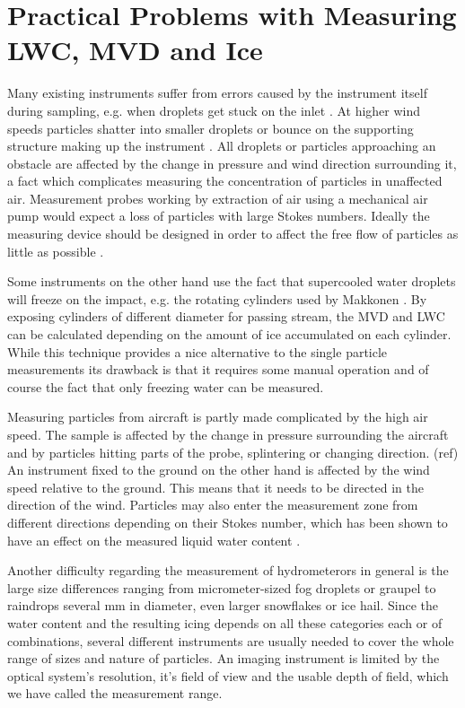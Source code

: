 \section{Practical Problems with Measuring LWC, MVD and Ice}
Many existing instruments suffer from errors caused by the instrument itself during sampling, e.g. when droplets get stuck on the inlet \cite{spie2012}. At higher wind speeds particles shatter into smaller droplets or bounce on the supporting structure making up the instrument \cite{cohen1991,field2006}. All droplets or particles approaching an obstacle are affected by the change in pressure and wind direction surrounding it, a fact which complicates measuring the concentration of particles in unaffected air. Measurement probes working by extraction of air using a mechanical air pump would expect a loss of particles with large Stokes numbers. Ideally the measuring device should be designed in order to affect the free flow of particles as little as possible \cite{baum2011}.

Some instruments on the other hand use the fact that supercooled water droplets will freeze on the impact, e.g. the rotating cylinders used by Makkonen \cite{makk1992}. By exposing cylinders of different diameter for passing stream, the MVD and LWC can be calculated depending on the amount of ice accumulated on each cylinder. While this technique provides a nice alternative to the single particle measurements its drawback is that it requires some manual operation and of course the fact that only freezing water can be measured.

Measuring particles from aircraft is partly made complicated by the high air speed. The sample is affected by the change in pressure surrounding the aircraft and by particles hitting parts of the probe, splintering or changing direction. (ref) An instrument fixed to the ground on the other hand is affected by the wind speed relative to the ground. This means that it needs to be directed in the direction of the wind. Particles may also enter the measurement zone from different directions depending on their Stokes number, which has been shown to have an effect on the measured liquid water content \cite{henn2013}.

Another difficulty regarding the measurement of hydrometerors in general is the large size differences ranging from micrometer-sized fog droplets or graupel to raindrops several mm in diameter, even larger snowflakes or ice hail. Since the water content and the resulting icing depends on all these categories each or of combinations, several different instruments are usually needed to cover the whole range of sizes and nature of particles. An imaging instrument is limited by the optical system's resolution, it's field of view and the usable depth of field, which we have called the measurement range.

